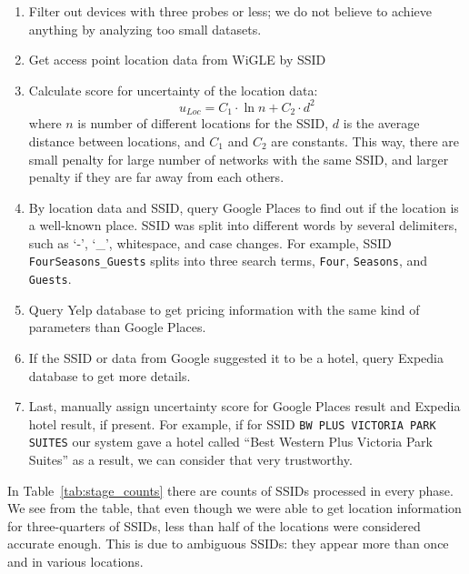\documentclass[12pt,a4paper,oneside,pdftex]{report}
\begin{document}
\begin{enumerate}
    \item Filter out devices with three probes or less; we do not believe to achieve anything by analyzing too small datasets.

    \item Get access point location data from WiGLE by SSID
    
    \item Calculate score for uncertainty of the location data:
        $$ u_{Loc} = C_1 \cdot \ln n + C_2 \cdot d^2 $$
        where $n$ is number of different locations for the SSID, $d$ is the average distance between locations, and $C_1$ and $C_2$ are constants. This way, there are small penalty for large number of networks with the same SSID, and larger penalty if they are far away from each others.
    
    \item By location data and SSID, query Google Places to find out if the location is a well-known place. SSID was split into different words by several delimiters, such as `-', `\_', whitespace, and case changes. For example, SSID \texttt{FourSeasons\_Guests} splits into three search terms, \texttt{Four}, \texttt{Seasons}, and \texttt{Guests}.

    \item Query Yelp database to get pricing information with the same kind of parameters than Google Places.

    \item If the SSID or data from Google suggested it to be a hotel, query Expedia database to get more details.

    \item Last, manually assign uncertainty score for Google Places result and Expedia hotel result, if present. For example, if for SSID \texttt{BW PLUS VICTORIA PARK SUITES} our system gave a hotel called ``Best Western Plus Victoria Park Suites'' as a result, we can consider that very trustworthy.
\end{enumerate}

In Table~\ref{tab:stage_counts} there are counts of SSIDs processed in every phase. We see from the table, that even though we were able to get location information for three-quarters of SSIDs, less than half of the locations were considered accurate enough. This is due to ambiguous SSIDs: they appear more than once and in various locations.
\end{document}
